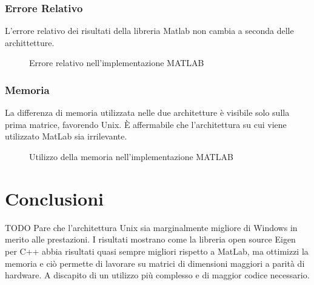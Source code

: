 \documentclass[11pt,italian]{article}
\begin{document}
\subsubsection*{Errore Relativo}
L'errore relativo dei risultati della libreria Matlab non cambia a seconda delle archittetture.
\begin{figure}[H]
    \caption{Errore relativo nell'implementazione MATLAB}
    \label{fig:matlab-error}
\end{figure}

\subsubsection*{Memoria}
La differenza di memoria utilizzata nelle due architetture è visibile solo sulla prima matrice, favorendo Unix.\newline
È affermabile che l'architettura su cui viene utilizzato MatLab sia irrilevante.
\begin{figure}[H]
    \caption{Utilizzo della memoria nell'implementazione MATLAB}
    \label{fig:matlab-memory}
\end{figure}

\newpage
\section{Conclusioni}
TODO
Pare che l'architettura Unix sia marginalmente migliore di Windows in merito alle prestazioni.\newline
I risultati mostrano come la libreria open source Eigen per C++ abbia risultati quasi sempre migliori rispetto a MatLab, ma ottimizzi la memoria e ciò permette di lavorare su matrici di dimensioni maggiori a parità di hardware. A discapito di un utilizzo più complesso e di maggior codice necessario.
\end{document}
